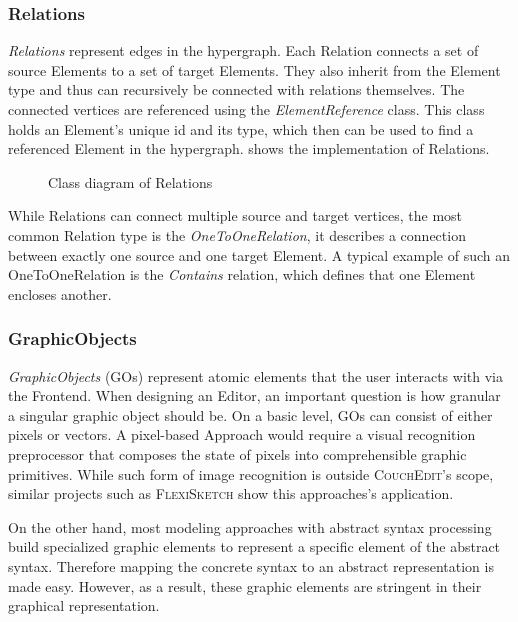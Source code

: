 
\subsubsection{Relations}
\label{sec:relations}
\emph{Relations} represent edges in the hypergraph. Each Relation connects a set of source Elements to a set of target Elements. They also inherit from the Element type and thus can recursively be connected with relations themselves. The connected vertices are referenced using the \emph{ElementReference} class. This class holds an Element's unique id and its type, which then can be used to find a referenced Element in the hypergraph.  shows the implementation of Relations. 

\begin{figure}[ht]
  \centering
  
  \caption{Class diagram of Relations}
  \label{fig:relations}
\end{figure}

 While Relations can connect multiple source and target vertices, the most common Relation type is the \emph{OneToOneRelation}, it describes a connection between exactly one source and one target Element. A typical example of such an OneToOneRelation is the \emph{Contains} relation, which defines that one Element encloses another.  


\subsubsection{GraphicObjects}
\emph{GraphicObjects} (GOs) represent atomic elements that the user interacts with via the Frontend. When designing an Editor, an important question is how granular a singular graphic object should be. On a basic level, GOs can consist of either pixels or vectors. A pixel-based Approach would require a visual recognition preprocessor that composes the state of pixels into comprehensible graphic primitives. While such form of image recognition is outside \textsc{CouchEdit}'s scope, similar projects such as \textsc{FlexiSketch} \cite{wuest_flexisketch_2015} show this approaches's application.

On the other hand, most modeling approaches with abstract syntax processing build specialized graphic elements to represent a specific element of the abstract syntax. Therefore mapping the concrete syntax to an abstract representation is made easy. However, as a result, these graphic elements are stringent in their graphical representation.


